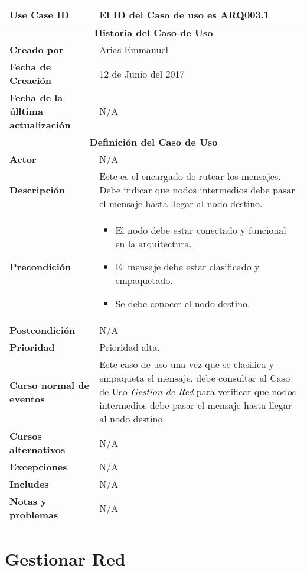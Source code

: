 \begin{longtable}{|p{5cm}|p{8cm}|}
  \hline
  \textbf{Use Case ID} & El ID del Caso de uso es ARQ003.1 \\ \hline
  \multicolumn{2}{|c|}{\Large\textbf{Historia del Caso de Uso}} \\ \hline
  \textbf{Creado por} & Arias Emmanuel \\ \hline
  \textbf{Fecha de Creación} & 12 de Junio del 2017 \\ \hline
  \textbf{Fecha de la úlltima actualización} & N/A \\ \hline
  \multicolumn{2}{|c|}{\Large\textbf{Definición del Caso de Uso}} \\ \hline
  \textbf{Actor} & N/A \\ \hline
  \textbf{Descripción} & Este es el encargado de rutear los mensajes. Debe indicar que nodos intermedios
debe pasar el mensaje hasta llegar al nodo destino. \\ \hline
  \textbf{Precondición} & \begin{itemize}
\item El nodo debe estar conectado y funcional en la arquitectura.
\item El mensaje debe estar clasificado y empaquetado.
\item Se debe conocer el nodo destino. 
\end{itemize} \\ \hline
  \textbf{Postcondición}  & N/A \\ \hline
  \textbf{Prioridad} & Prioridad alta. \\ \hline
  \textbf{Curso normal de eventos} & Este caso de uso una vez que se clasifica y empaqueta el mensaje,
debe consultar al Caso de Uso \textit{Gestion de Red} para verificar
que nodos intermedios debe pasar el mensaje hasta llegar al nodo
destino.  \\ \hline
\textbf{Cursos alternativos} & N/A \\ \hline
\textbf{Excepciones} & N/A \\ \hline
\textbf{Includes} & N/A \\ \hline
\textbf{Notas y problemas} & N/A \\ \hline
\end{longtable}


\section{Gestionar Red}\label{uc:GestionarRed}

